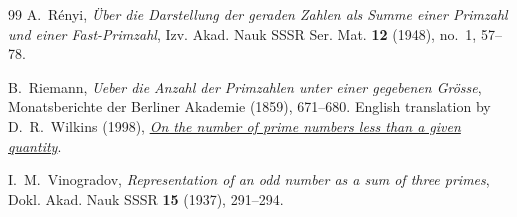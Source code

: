 \documentclass[12pt,a4paper]{amsart}
\numberwithin{equation}{section}
\theoremstyle{plain}
\theoremstyle{definition}
\theoremstyle{remark}
\begin{document}
\begin{thebibliography}{99}
A.~R\'enyi,
\emph{\"Uber die Darstellung der geraden Zahlen als Summe einer
Primzahl und einer Fast-Primzahl},
Izv. Akad. Nauk SSSR Ser. Mat. \textbf{12} (1948), no.~1, 57--78.

B.~Riemann,
\emph{Ueber die Anzahl der Primzahlen unter einer gegebenen Gr\"osse},
Monatsberichte der Berliner Akademie (1859), 671--680.
English translation by D.~R.~Wilkins (1998),
\href{https://www.maths.tcd.ie/pub/HistMath/People/Riemann/Zeta/EZeta.pdf}
{\emph{On the number of prime numbers less than a given quantity}}.

I.~M.~Vinogradov,
\emph{Representation of an odd number as a sum of three primes},
Dokl. Akad. Nauk SSSR \textbf{15} (1937), 291--294.

\end{thebibliography}
\end{document}
